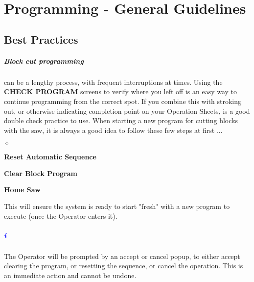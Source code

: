 \chapter{Programming - General Guidelines}
\section{Best Practices}\paragraph*{Block cut programming}can be a lengthy process, with frequent interruptions at times. Using the \textbf{CHECK PROGRAM} screens to verify where you left off is an easy way to continue programming from the correct spot. If you combine this with stroking out, or otherwise indicating completion point on your Operation Sheets, is a good double check practice to use. When starting a new program for cutting blocks with the saw, it is always a good idea to follow these few steps at first ...
\begin{list}{$\diamond$}{}
	\item \textbf{Reset Automatic Sequence}
	\item \textbf{Clear Block Program}
	\item \textbf{Home Saw}
\end{list}
This will ensure the system is ready to start "fresh" with a new program to execute (once the Operator enters it).
\paragraph{\textbf{\LARGE \textcolor{blue}{i}}}The Operator will be prompted by an accept or cancel popup, to either accept clearing the program, or resetting the sequence, or cancel the operation. This is an immediate action and cannot be undone.